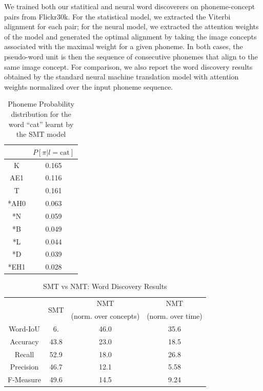 \documentclass[a4paper]{article}
\begin{document}
We trained both our statitical and neural word discoverers on phoneme-concept pairs from Flickr30k. For the statistical model, we extracted the Viterbi alignment for each pair; for the neural model, we extracted the attention weights of the model and generated the optimal alignment by taking the image concepts associated with the maximal weight for a given phoneme. In both cases, the pseudo-word unit is then the sequence of consecutive phonemes that align to the same image concept. For comparison, we also report the word discovery results obtained by the standard neural machine translation model with attention weights normalized over the input phoneme sequence. 



\begin{table}[ht]
    \centering
    \caption{Phoneme Probability distribution for the word ``cat'' learnt by the SMT model}
    \begin{tabular}{|c|c|}
        \hline
        & $P[\pi|l=\text{cat}]$\\
        \hline
        K & 0.165\\
        AE1 & 0.116\\
        T & 0.161 \\
        *AH0 & 0.063\\
        *N & 0.059 \\
        *B & 0.049 \\
        *L & 0.044 \\
        *D & 0.039 \\
        *EH1 & 0.028\\
        \hline
    \end{tabular}
    \label{tab:my_label}
\end{table}



\begin{table}[th]
    \centering
    \caption{SMT vs NMT: Word Discovery Results}
    \begin{tabular}{|c|c|c|c|}
    \hline
        & \multirow{2}{*}{SMT} & NMT  & NMT\\
        & & (norm. over concepts) & (norm. over time)\\
    \hline
    Word-IoU & 6. & 46.0 & 35.6 \\
    Accuracy & 43.8 & 23.0 & 18.5 \\
    Recall   & 52.9 & 18.0 & 26.8 \\
    Precision & 46.7 & 12.1 & 5.58 \\
    F-Measure & 49.6 & 14.5 & 9.24\\
    \hline
    \end{tabular}
    \label{tab:word_discovery_res}
\end{table}
\end{document}
